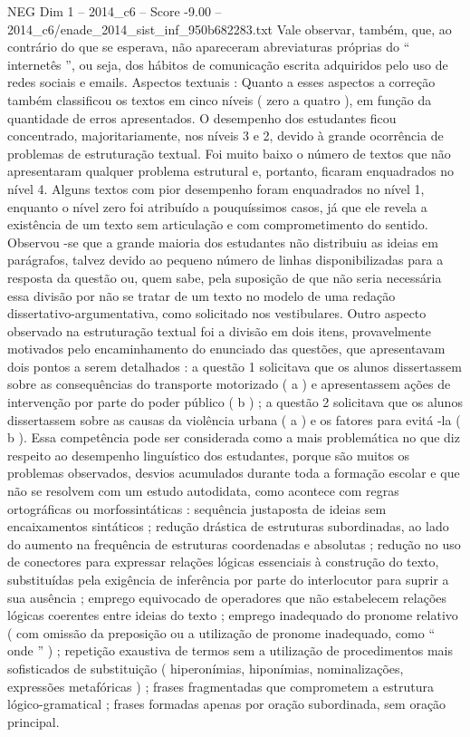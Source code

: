 \begin{textsample}{NEG Dim 1 – 2014\_c6 – Score -9.00 – 2014\_c6/enade\_2014\_sist\_inf\_950b682283.txt}
Vale observar, também, que, ao contrário do que se esperava, não apareceram abreviaturas próprias do “ internetês ”, ou seja, dos hábitos de comunicação escrita adquiridos pelo uso de redes sociais e emails.
Aspectos textuais : Quanto a esses aspectos a correção também classificou os textos em cinco níveis ( zero a quatro ), em função da quantidade de erros apresentados.
O desempenho dos estudantes ficou concentrado, majoritariamente, nos níveis 3 e 2, devido à grande ocorrência de problemas de estruturação textual.
Foi muito baixo o número de textos que não apresentaram qualquer problema estrutural e, portanto, ficaram enquadrados no nível 4.
Alguns textos com pior desempenho foram enquadrados no nível 1, enquanto o nível zero foi atribuído a pouquíssimos casos, já que ele revela a existência de um texto sem articulação e com comprometimento do sentido.
Observou -se que a grande maioria dos estudantes não distribuiu as ideias em parágrafos, talvez devido ao pequeno número de linhas disponibilizadas para a resposta da questão ou, quem sabe, pela suposição de que não seria necessária essa divisão por não se tratar de um texto no modelo de uma redação dissertativo-argumentativa, como solicitado nos vestibulares.
Outro aspecto observado na estruturação textual foi a divisão em dois itens, provavelmente motivados pelo encaminhamento do enunciado das questões, que apresentavam dois pontos a serem detalhados : a questão 1 solicitava que os alunos dissertassem sobre as consequências do transporte motorizado ( a ) e apresentassem ações de intervenção por parte do poder público ( b ) ; a questão 2 solicitava que os alunos dissertassem sobre as causas da violência urbana ( a ) e os fatores para evitá -la ( b ).
Essa competência pode ser considerada como a mais problemática no que diz respeito ao desempenho linguístico dos estudantes, porque são muitos os problemas observados, desvios acumulados durante toda a formação escolar e que não se resolvem com um estudo autodidata, como acontece com regras ortográficas ou morfossintáticas : sequência justaposta de ideias sem encaixamentos sintáticos ; redução drástica de estruturas subordinadas, ao lado do aumento na frequência de estruturas coordenadas e absolutas ; redução no uso de conectores para expressar relações lógicas essenciais à construção do texto, substituídas pela exigência de inferência por parte do interlocutor para suprir a sua ausência ; emprego equivocado de operadores que não estabelecem relações lógicas coerentes entre ideias do texto ; emprego inadequado do pronome relativo ( com omissão da preposição ou a utilização de pronome inadequado, como “ onde ” ) ; repetição exaustiva de termos sem a utilização de procedimentos mais sofisticados de substituição ( hiperonímias, hiponímias, nominalizações, expressões metafóricas ) ; frases fragmentadas que comprometem a estrutura lógico-gramatical ; frases formadas apenas por oração subordinada, sem oração principal.

\end{textsample}

